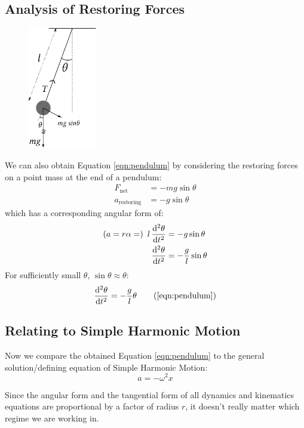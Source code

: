 \documentclass[11pt]{article}
\begin{document}
	\subsection*{Analysis of Restoring Forces}
	\begin{figure}
		\vspace{-0.5cm}
		\centering
		\includegraphics[width=3cm]{pendulum-restoring.eps}
		\vspace{-2cm}
	\end{figure}
	
	We can also obtain Equation \eqref{eqn:pendulum} by considering the restoring forces on a point mass at the end of a pendulum:
	\begin{align*}
	F_{\text{net}} &= -mg \sin \theta \\
	a_{\text{restoring}} &= -g\sin \theta 
	\end{align*}
	which has a corresponding angular form of:
	\begin{align*}
	\left(a = r \alpha = \right)~ l \dod[2]{\theta}{t} &= -g\sin \theta \\ 
	\dod[2]{\theta}{t} &= -\frac{g}{l}\sin\theta
	\end{align*}
	For sufficiently small $\theta$, $\sin \theta \approx \theta$:
	\begin{equation*}
	\dod[2]{\theta}{t} = -\frac{g}{l}\theta \tag{\ref{eqn:pendulum}}
	\end{equation*}
	
	\subsection*{Relating to Simple Harmonic Motion}
	Now we compare the obtained Equation \eqref{eqn:pendulum} to the general solution/defining equation of Simple Harmonic Motion:
	\begin{equation}
	a=-\omega^2x \label{eqn:shm}
	\end{equation}
	
	Since the angular form and the tangential form of all dynamics and kinematics equations are proportional by a factor of radius $r$, it doesn't really matter which regime we are working in.
	
\end{document}
